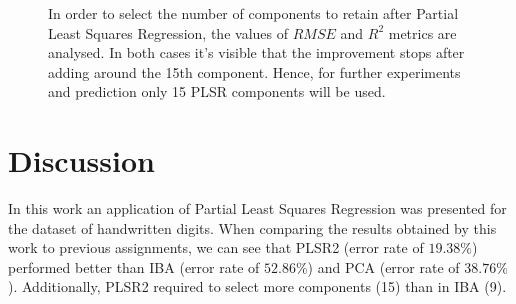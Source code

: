 \documentclass[a4,12pt]{article}
\begin{document}
    \begin{figure}[h!]
        \centering
        \caption{
        In order to select the number of components to retain after Partial Least Squares Regression, the values of $RMSE$ and $R^2$ metrics are analysed.
        In both cases it's visible that the improvement stops after adding around the 15th component.
        Hence, for further experiments and prediction only 15 PLSR components will be used.
        }
        \label{fig:plsr}
    \end{figure}

    \section{Discussion}
    In this work an application of Partial Least Squares Regression was presented for the dataset of handwritten digits.
    When comparing the results obtained by this work to previous assignments, we can see that PLSR2 (error rate of $19.38\%$) performed better than IBA (error rate of $52.86\%$) and PCA (error rate of $38.76\%$).
    Additionally, PLSR2 required to select more components (15) than in IBA (9).
\end{document}

